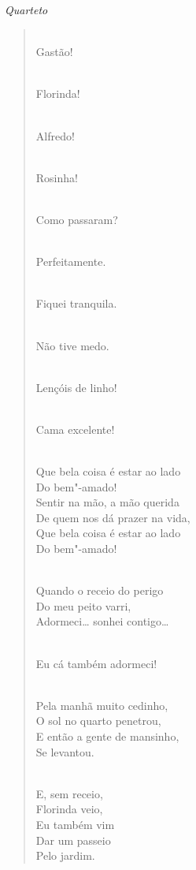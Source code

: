 {\smallskip\raggedleft\itshape Quarteto\par}
\begin{verse}
\\
Gastão!

\\
Florinda!

\\
Alfredo!

\\
Rosinha!

\\
Como passaram?

\\
Perfeitamente.

\\
Fiquei tranquila.

\\
Não tive medo.

\pagebreak

\\
Lençóis de linho!

\\
Cama excelente!

\\
Que bela coisa é estar ao lado\\
Do bem"-amado!\\
Sentir na mão, a mão querida\\
De quem nos dá prazer na vida,\\
Que bela coisa é estar ao lado\\
Do bem"-amado!

\\
Quando o receio do perigo\\
Do meu peito varri,\\
Adormeci\ldots{} sonhei contigo\ldots

\\
Eu cá também adormeci!

\\
Pela manhã muito cedinho,\\
O sol no quarto penetrou,\\
E então a gente de mansinho,\\
Se levantou.

\pagebreak

\\
E, sem receio,\\
Florinda veio,\\
Eu também vim\\
Dar um passeio\\
Pelo jardim.


\end{verse}

